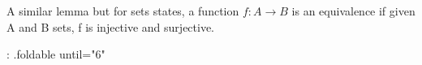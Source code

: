 A similar lemma but for sets states, a function $f : A → B$ is an equivalence if
given A and B sets, f is injective and surjective.




{: .foldable until="6"}
\begin{code}%
\>[0]\<%
\\
%
\>[2]\<%
\\
%
\>[2]\<%
\\
%
\>[2]\<%
\\
%
\>[2]\AgdaComment{--   ---------------------}\<%
\\
%
\>[2]\<%
\\
%
\>[2]\AgdaComment{--}\<%
\\
%
\>[2]\<%
\end{code}



